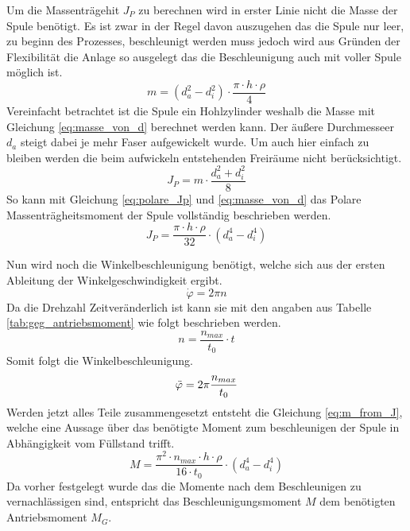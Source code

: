 Um die Massenträgehit $J_P$ zu berechnen wird in erster Linie nicht die Masse der Spule benötigt. Es ist zwar in der Regel davon auszugehen das die Spule nur leer, zu beginn des Prozesses, beschleunigt werden muss jedoch wird aus Gründen der Flexibilität die Anlage so ausgelegt das die Beschleunigung auch mit voller Spule möglich ist. 
\begin{equation}\label{eq:masse_von_d}
    m = (d_a^2-d_i^2) \cdot \frac{\pi \cdot h \cdot \rho}{4}
\end{equation}
Vereinfacht betrachtet ist die Spule ein Hohlzylinder weshalb die Masse mit Gleichung \ref{eq:masse_von_d} berechnet werden kann. Der äußere Durchmesseer $d_a$ steigt dabei je mehr Faser aufgewickelt wurde. Um auch hier einfach zu bleiben werden die beim aufwickeln entstehenden Freiräume nicht berücksichtigt. 
\begin{equation}\label{eq:polare_Jp}
    J_P = m \cdot \frac{d_a^2+d_i^2}{8}
\end{equation}
So kann mit  Gleichung \ref{eq:polare_Jp} und \ref{eq:masse_von_d} das Polare Massenträgheitsmoment der Spule vollständig beschrieben werden.
\begin{equation}
    J_P = \frac{\pi \cdot h \cdot \rho}{32} \cdot (d_a^4-d_i^4)
\end{equation}

Nun wird noch die Winkelbeschleunigung benötigt, welche sich aus der ersten Ableitung der Winkelgeschwindigkeit ergibt.
\begin{equation}\label{eq:winkelgeschwinigkeit}
    \dot{\varphi} = 2\pi n
\end{equation}
Da die Drehzahl Zeitveränderlich ist kann sie mit den angaben aus Tabelle \ref{tab:geg_antriebsmoment} wie folgt beschrieben werden.
\begin{equation}
    n= \frac{n_{max}}{t_0} \cdot t
\end{equation}
Somit folgt die Winkelbeschleunigung.
\begin{equation}\label{eq:winkelbneschleunigung}
    \Ddot{\varphi} = 2\pi \frac{n_{max}}{t_0}
\end{equation}
Werden jetzt alles Teile zusammengesetzt entsteht die Gleichung \ref{eq:m_from_J}, welche eine Aussage über das benötigte Moment zum beschleunigen der Spule in Abhängigkeit vom Füllstand trifft.
\begin{equation}\label{eq:m_from_J}
    M = \frac{\pi ^2 \cdot n_{max} \cdot h \cdot \rho}{16 \cdot t_0}\cdot(d_a^4-d_i^4)
\end{equation}
Da vorher festgelegt wurde das die Momente nach dem Beschleunigen zu vernachlässigen sind, entspricht das Beschleunigungsmoment $M$ dem benötigten Antriebsmoment $M_G$.

